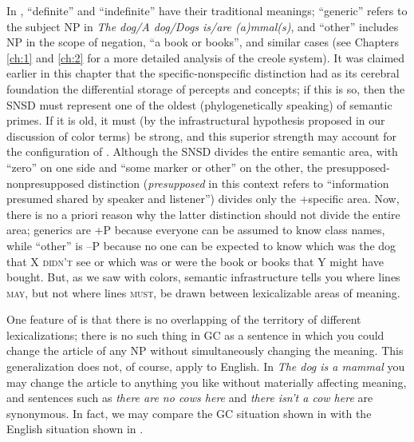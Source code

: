 

In , ``definite'' and ``indefinite'' have their traditional meanings; ``generic'' refers to the subject NP in \textit{The dog/A dog/Dogs is/are (a)mmal(s)}, and ``other'' includes NP in the scope of negation, ``a book or books'', and similar cases (see Chapters \ref{ch:1} and \ref{ch:2} for a more detailed analysis of the creole system). It was claimed earlier in this chapter that the specific-nonspecific distinction had as its cerebral foundation the differential storage of percepts and concepts; if this is so, then the SNSD must represent one of the oldest (phylogenetically speaking) of semantic primes. If it is old, it must (by the infrastructural hypothesis proposed in our discussion of color terms) be strong, and this superior strength may account for the configuration of . Although the SNSD divides the entire semantic area, with ``zero'' on one side and ``some marker or other'' on the other, the presupposed-nonpresupposed distinction (\textit{presupposed} in this context refers to ``information presumed shared by speaker and listener'') divides only the +specific area. Now, there is no a priori reason why the latter distinction should not divide the entire area; generics are +P because everyone can be assumed to know class names, while ``other'' is --P because no one can be expected to know which was the dog that X \textsc{didn't} see or which was or were the book or books that Y might have bought. But, as we saw with colors, semantic infrastructure tells you where lines \textsc{may}, but not where lines \textsc{must}, be drawn between lexicalizable areas of meaning.

One feature of  is that there is no overlapping of the territory of different lexicalizations; there is no such thing in GC as a sentence in which you could change the article of any NP without simultaneously changing the meaning. This generalization does not, of course, apply to English. In \textit{The dog is a mammal} you may change the article to anything you like without materially affecting meaning, and sentences such as \textit{there are no cows here} and \textit{there isn't a cow here} are synonymous. In fact, we may compare the GC situation shown in  with the English situation shown in . %

